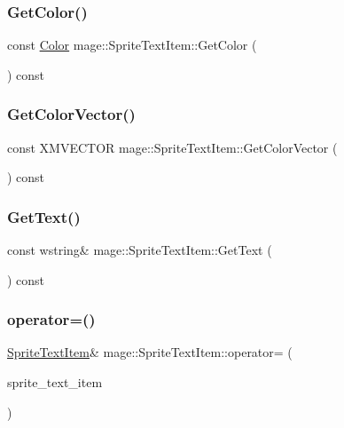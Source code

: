\subsubsection{\texorpdfstring{Get\+Color()}{GetColor()}}
{\footnotesize\ttfamily const \hyperlink{structmage_1_1_color}{Color} mage\+::\+Sprite\+Text\+Item\+::\+Get\+Color (\begin{DoxyParamCaption}{ }\end{DoxyParamCaption}) const}

\hypertarget{structmage_1_1_sprite_text_item_aa42efb6fce8dd283ee2bfb16ce459f93}{}\label{structmage_1_1_sprite_text_item_aa42efb6fce8dd283ee2bfb16ce459f93} 
\subsubsection{\texorpdfstring{Get\+Color\+Vector()}{GetColorVector()}}
{\footnotesize\ttfamily const X\+M\+V\+E\+C\+T\+OR mage\+::\+Sprite\+Text\+Item\+::\+Get\+Color\+Vector (\begin{DoxyParamCaption}{ }\end{DoxyParamCaption}) const}

\hypertarget{structmage_1_1_sprite_text_item_a5011cbf5dfb7763caa8b9516be339530}{}\label{structmage_1_1_sprite_text_item_a5011cbf5dfb7763caa8b9516be339530} 
\subsubsection{\texorpdfstring{Get\+Text()}{GetText()}}
{\footnotesize\ttfamily const wstring\& mage\+::\+Sprite\+Text\+Item\+::\+Get\+Text (\begin{DoxyParamCaption}{ }\end{DoxyParamCaption}) const}

\hypertarget{structmage_1_1_sprite_text_item_ac0c8772b01eaa324e46dc53d08a9ea35}{}\label{structmage_1_1_sprite_text_item_ac0c8772b01eaa324e46dc53d08a9ea35} 
\subsubsection{\texorpdfstring{operator=()}{operator=()}\hspace{0.1cm}{\footnotesize\ttfamily [1/2]}}
{\footnotesize\ttfamily \hyperlink{structmage_1_1_sprite_text_item}{Sprite\+Text\+Item}\& mage\+::\+Sprite\+Text\+Item\+::operator= (\begin{DoxyParamCaption}\item[{const \hyperlink{structmage_1_1_sprite_text_item}{Sprite\+Text\+Item} \&}]{sprite\+\_\+text\+\_\+item }\end{DoxyParamCaption})\hspace{0.3cm}{\ttfamily [default]}}

